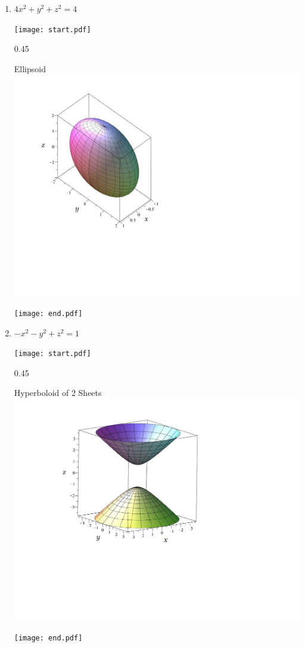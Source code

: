 \documentclass[12pt]{article}
\begin{document}
\begin{enumerate}

\item $4x^2+y^2+z^2=4$

\texttt{[image: start.pdf]}
{{{0.45\linewidth}{\begin{center}Ellipsoid\\\includegraphics[scale=0.5]{ellipsoid.pdf}\end{center}}}}
\texttt{[image: end.pdf]}


\item $-x^2-y^2+z^2=1$

\texttt{[image: start.pdf]}
{{{0.45\linewidth}{\begin{center}Hyperboloid of 2 Sheets\\\includegraphics[scale=0.4]{hyperboloid2.pdf}\end{center}}}}
\texttt{[image: end.pdf]}



\end{enumerate}
\end{document}
